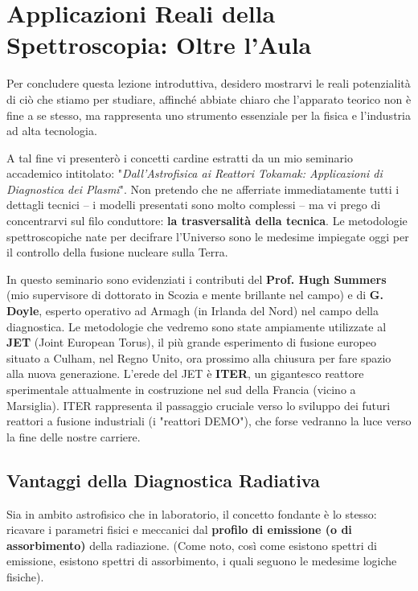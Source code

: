 \section{Applicazioni Reali della Spettroscopia: Oltre l'Aula}

Per concludere questa lezione introduttiva, desidero mostrarvi le reali potenzialità di ciò che stiamo per studiare, affinché abbiate chiaro che l'apparato teorico non è fine a se stesso, ma rappresenta uno strumento essenziale per la fisica e l'industria ad alta tecnologia.

A tal fine vi presenterò i concetti cardine estratti da un mio seminario accademico intitolato: "\textit{Dall'Astrofisica ai Reattori Tokamak: Applicazioni di Diagnostica dei Plasmi}".
Non pretendo che ne afferriate immediatamente tutti i dettagli tecnici – i modelli presentati sono molto complessi – ma vi prego di concentrarvi sul filo conduttore: \textbf{la trasversalità della tecnica}. Le metodologie spettroscopiche nate per decifrare l'Universo sono le medesime impiegate oggi per il controllo della fusione nucleare sulla Terra.

In questo seminario sono evidenziati i contributi del \textbf{Prof. Hugh Summers} (mio supervisore di dottorato in Scozia e mente brillante nel campo) e di \textbf{G. Doyle}, esperto operativo ad Armagh (in Irlanda del Nord) nel campo della diagnostica. Le metodologie che vedremo sono state ampiamente utilizzate al \textbf{JET} (Joint European Torus), il più grande esperimento di fusione europeo situato a Culham, nel Regno Unito, ora prossimo alla chiusura per fare spazio alla nuova generazione. L'erede del JET è \textbf{ITER}, un gigantesco reattore sperimentale attualmente in costruzione nel sud della Francia (vicino a Marsiglia). ITER rappresenta il passaggio cruciale verso lo sviluppo dei futuri reattori a fusione industriali (i "reattori DEMO"), che forse vedranno la luce verso la fine delle nostre carriere.

    \subsection{Vantaggi della Diagnostica Radiativa}
    
    Sia in ambito astrofisico che in laboratorio, il concetto fondante è lo stesso: ricavare i parametri fisici e meccanici dal \textbf{profilo di emissione (o di assorbimento)} della radiazione. (Come noto, così come esistono spettri di emissione, esistono spettri di assorbimento, i quali seguono le medesime logiche fisiche).
    
